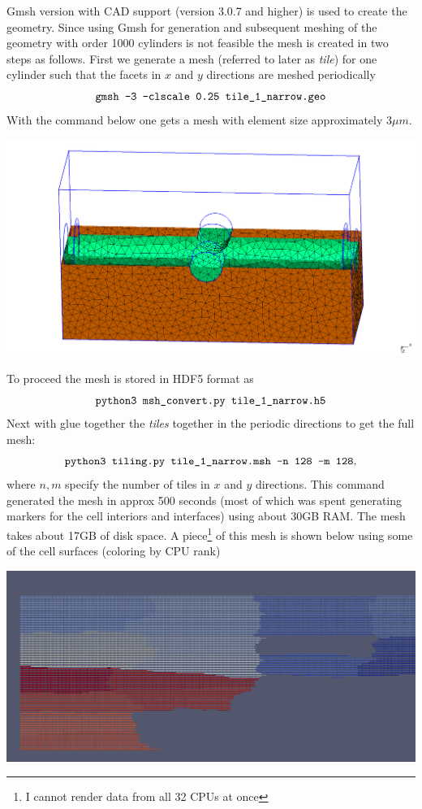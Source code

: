 \documentclass[11pt,a4paper]{article}
\begin{document}
Gmsh version with CAD support (version 3.0.7 and higher) is used to create
the geometry. Since using Gmsh for generation and subsequent meshing of the 
geometry with order 1000 cylinders is not feasible the mesh is created in two 
steps as follows. First we generate a mesh (referred to later as \emph{tile}) 
for one cylinder such that the facets in $x$ and $y$ directions are meshed periodically
\[
\texttt{gmsh -3 -clscale 0.25 tile\textunderscore 1\textunderscore narrow.geo}
\]
With the command below one gets a mesh with element size approximately 3$\mu m$.
\begin{center}
\includegraphics[width=\textwidth]{tile_1.png}
\end{center}
To proceed the mesh is stored in HDF5 format as
\[
\texttt{python3 msh\textunderscore convert.py tile\textunderscore 1\textunderscore narrow.h5}
\]
Next with glue together the \emph{tiles} together in the periodic directions to 
get the full mesh:
\[
\texttt{python3 tiling.py tile\textunderscore 1\textunderscore narrow.msh -n 128 -m 128},
\]
where $n, m$ specify the number of tiles in $x$ and $y$ directions. This command 
generated the mesh in approx 500 seconds (most of which was spent generating markers for the 
cell interiors and interfaces) using about 30GB RAM. The mesh takes about 17GB of disk space.
A piece\footnote{I cannot render data from all 32 CPUs at once} of this mesh is shown below 
using some of the cell surfaces (coloring by CPU rank) 
\begin{center}
\includegraphics[width=\textwidth]{piece.png}
\end{center}
\end{document}
